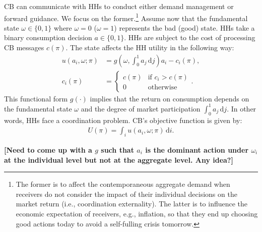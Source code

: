 \documentclass[12pt,a4paper]{article}
\begin{document}
CB can communicate with HHs to conduct either demand management or forward guidance. We focus on the former.\footnote{The former is to affect the contemporaneous aggregate demand when receivers do not consider the impact of their individual decisions on the market return (i.e., coordination externality). The latter is to influence the economic expectation of receivers, e.g., inflation, so that they end up choosing good actions today to avoid a self-fulling crisis tomorrow.} Assume now that the fundamental state $\omega \in \{0,1\}$ where $\omega=0$ ($\omega=1$) represents the bad (good) state. HHs take a binary consumption decision $a \in \{0,1\}$. HHs are subject to the cost of processing CB messages $c(\pi)$. The state affects the HH utility in the following way:
\begin{align}
    u(a_i,\omega;\pi) & = g\left(\omega,\int_0^1 a_j \, \mbox{d}j \right) a_i - c_i(\pi), \\
    c_i(\pi) & = \left\{\begin{array}{ll}
        c(\pi)   &  \mbox{if } c_i > c(\pi) \\
        0        &  \mbox{otherwise}
        \end{array}\right..
\end{align}
This functional form $g(\cdot)$ implies that the return on consumption depends on the fundamental state $\omega$ and the degree of market participation $\int_0^1 a_j \, \mbox{d}j$. In other words, HHs face a coordination problem. CB's objective function is given by:
\begin{align}
    U(\pi) = \int_i u(a_i,\omega; \pi) \, \mbox{d}i.
\end{align}

\textbf{[Need to come up with a $g$ such that $a_i$ is the dominant action under $\omega_i$ at the individual level but not at the aggregate level. Any idea?]}

\newpage


\end{document}
